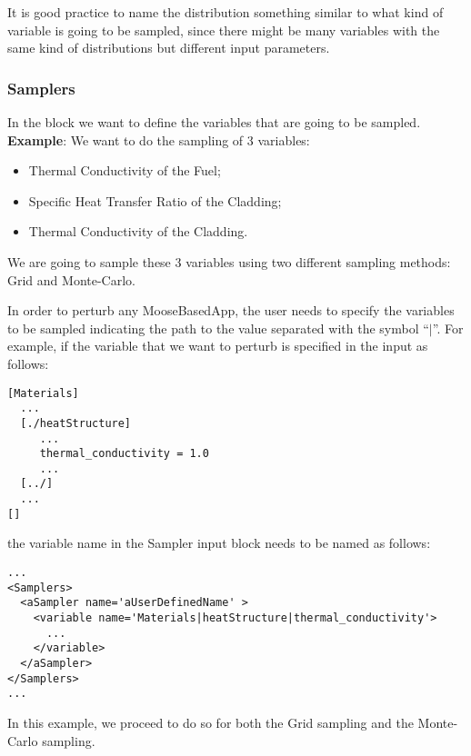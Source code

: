 It is good practice to name the distribution something similar to what kind of
variable is going to be sampled, since there might be many variables with the
same kind of distributions but different input parameters.
%
\subsubsection{Samplers}
In the  block we want to define the variables that are going
to be sampled.
%
\textbf{Example}:
We want to do the sampling of 3 variables:
\begin{itemize}
  \item Thermal Conductivity of the Fuel;
  \item Specific Heat Transfer Ratio of the Cladding;
  \item Thermal Conductivity of the Cladding.
\end{itemize}

We are going to sample these 3 variables using two different sampling methods:
Grid and Monte-Carlo.

In order to perturb any MooseBasedApp, the user needs to specify the variables to be
sampled indicating the path to the value separated with the symbol ``$|$''. For example,
if the variable that we want to perturb is specified in the input as follows:
\begin{lstlisting}[style=XML]
[Materials]
  ...
  [./heatStructure]
     ...
     thermal_conductivity = 1.0
     ...
  [../]
  ...
[]
\end{lstlisting}
the variable name in the Sampler input block needs to be named as follows:
\begin{lstlisting}[style=XML]
...
<Samplers>
  <aSampler name='aUserDefinedName' >
    <variable name='Materials|heatStructure|thermal_conductivity'>
      ...
    </variable>
  </aSampler>
</Samplers>
...
\end{lstlisting}
%
In this example, we proceed to do so for both the Grid sampling and the Monte-Carlo sampling.

